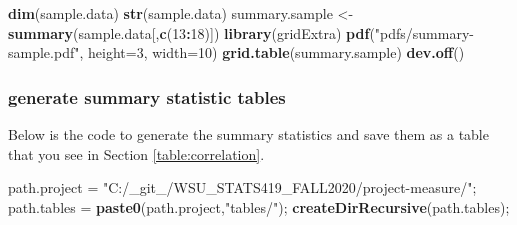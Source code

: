 \documentclass[]{article}
\newenvironment{Shaded}{\begin{snugshade}}{\end{snugshade}}
\newcommand{\DataTypeTok}[1]{\textcolor[rgb]{0.13,0.29,0.53}{#1}}
\newcommand{\DecValTok}[1]{\textcolor[rgb]{0.00,0.00,0.81}{#1}}
\newcommand{\KeywordTok}[1]{\textcolor[rgb]{0.13,0.29,0.53}{\textbf{#1}}}
\newcommand{\NormalTok}[1]{#1}
\newcommand{\OperatorTok}[1]{\textcolor[rgb]{0.81,0.36,0.00}{\textbf{#1}}}
\newcommand{\StringTok}[1]{\textcolor[rgb]{0.31,0.60,0.02}{#1}}
\begin{document}
\begin{Shaded}
\begin{Highlighting}[]
\KeywordTok{dim}\NormalTok{(sample.data)}
\KeywordTok{str}\NormalTok{(sample.data)}
\NormalTok{summary.sample \textless{}{-}}\KeywordTok{summary}\NormalTok{(sample.data[,}\KeywordTok{c}\NormalTok{(}\DecValTok{13}\OperatorTok{:}\DecValTok{18}\NormalTok{)])}
\KeywordTok{library}\NormalTok{(gridExtra)}
\KeywordTok{pdf}\NormalTok{(}\StringTok{"pdfs/summary{-}sample.pdf"}\NormalTok{, }\DataTypeTok{height=}\DecValTok{3}\NormalTok{, }\DataTypeTok{width=}\DecValTok{10}\NormalTok{)}
\KeywordTok{grid.table}\NormalTok{(summary.sample)}
\KeywordTok{dev.off}\NormalTok{()}
\end{Highlighting}
\end{Shaded}

\subsubsection{generate summary statistic tables}
\label{sec:appendix-setup2}

Below is the code to generate the summary statistics and save them as a
table that you see in Section \ref{table:correlation}.

\begin{Shaded}
\begin{Highlighting}[]
\NormalTok{path.project =}\StringTok{ "C:/\_git\_/WSU\_STATS419\_FALL2020/project{-}measure/"}\NormalTok{;}
\NormalTok{path.tables =}\StringTok{ }\KeywordTok{paste0}\NormalTok{(path.project,}\StringTok{"tables/"}\NormalTok{);}
  \KeywordTok{createDirRecursive}\NormalTok{(path.tables);}
\end{Highlighting}
\end{Shaded}
\end{document}
